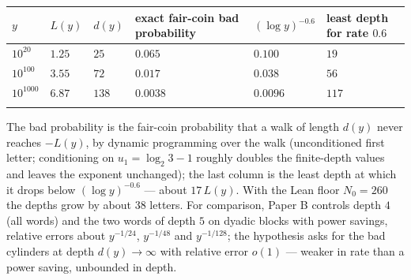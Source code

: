 \documentclass[11pt,a4paper]{article}
\begin{document}
\begin{longtable}[]{@{}
  >{\raggedright\arraybackslash}p{}
  >{\raggedright\arraybackslash}p{}
  >{\raggedright\arraybackslash}p{}
  >{\raggedright\arraybackslash}p{}
  >{\raggedright\arraybackslash}p{}
  >{\raggedright\arraybackslash}p{}@{}}
\toprule\noalign{}
\begin{minipage}[b]{\linewidth}\raggedright
\(y\)
\end{minipage} & \begin{minipage}[b]{\linewidth}\raggedright
\(L(y)\)
\end{minipage} & \begin{minipage}[b]{\linewidth}\raggedright
\(d(y)\)
\end{minipage} & \begin{minipage}[b]{\linewidth}\raggedright
exact fair-coin bad probability
\end{minipage} & \begin{minipage}[b]{\linewidth}\raggedright
\((\log y)^{-0.6}\)
\end{minipage} & \begin{minipage}[b]{\linewidth}\raggedright
least depth for rate \(0.6\)
\end{minipage} \\
\midrule\noalign{}
\endhead
\bottomrule\noalign{}
\endfoot
\bottomrule\noalign{}
\endlastfoot
\(10^{20}\) & \(1.25\) & \(25\) & \(0.065\) & \(0.100\) & \(19\) \\
\(10^{100}\) & \(3.55\) & \(72\) & \(0.017\) & \(0.038\) & \(56\) \\
\(10^{1000}\) & \(6.87\) & \(138\) & \(0.0038\) & \(0.0096\) &
\(117\) \\*
\end{longtable}

\endgroup

The bad probability is the fair-coin probability that a walk of length
\(d(y)\) never reaches \(-L(y)\), by dynamic programming over the walk
(unconditioned first letter; conditioning on \(u_1=\log_2 3-1\) roughly
doubles the finite-depth values and leaves the exponent unchanged); the
last column is the least depth at which it drops below
\((\log y)^{-0.6}\) --- about \(17\,L(y)\). With the Lean floor
\(N_0=260\) the depths grow by about \(38\) letters. For comparison,
Paper B controls depth \(4\) (all words) and the two words of depth
\(5\) on dyadic blocks with power savings, relative errors about
\(y^{-1/24}\), \(y^{-1/48}\) and \(y^{-1/128}\); the hypothesis asks for
the bad cylinders at depth \(d(y)\to\infty\) with relative error
\(o(1)\) --- weaker in rate than a power saving, unbounded in depth.
\end{document}
